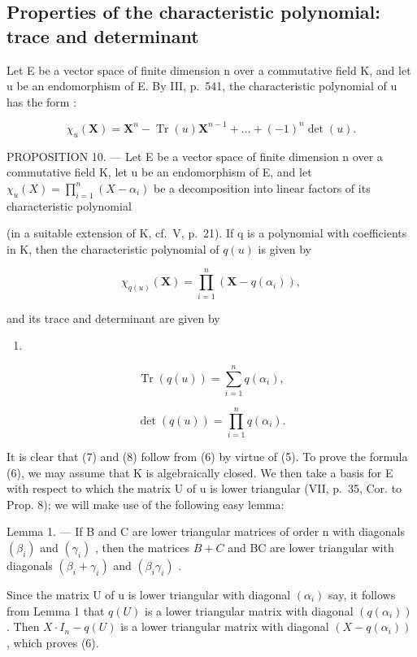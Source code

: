 \subsection{Properties of the characteristic polynomial: trace and determinant}

Let E be a vector space of finite dimension n over a commutative field K, and let u be an endomorphism of E. By III, p.~541, the characteristic polynomial of u has the form :

\[
\chi_ {u} (\mathbf {X}) = \mathbf {X} ^ {n} - \operatorname{Tr} (u) \mathbf {X} ^ {n - 1} + \dots + (- 1) ^ {n} \det (u).\tag{5}
\]

PROPOSITION 10. --- Let E be a vector space of finite dimension n over a commutative field K, let u be an endomorphism of E, and let \(\chi_u(X) = \prod_{i=1}^{n}(X - \alpha_i)\) be a decomposition into linear factors of its characteristic polynomial

(in a suitable extension of K, cf.~V, p.~21). If q is a polynomial with coefficients in K, then the characteristic polynomial of \(q(u)\) is given by

\[
\chi_ {q (u)} (\mathbf {X}) = \prod_ {i = 1} ^ {n} \left(\mathbf {X} - q \left(\alpha_ {i}\right)\right),\tag{6}
\]

and its trace and determinant are given by

\begin{enumerate}
\def\labelenumi{(\arabic{enumi})}
\setcounter{enumi}{6}
\tightlist
\item
\end{enumerate}

\[
\operatorname{Tr} (q (u)) = \sum_ {i = 1} ^ {n} q (\alpha_ {i}),\tag{8}
\]

\[
\det (q (u)) = \prod_ {i = 1} ^ {n} q (\alpha_ {i}).
\]

It is clear that (7) and (8) follow from (6) by virtue of (5). To prove the formula (6), we may assume that K is algebraically closed. We then take a basis for E with respect to which the matrix U of u is lower triangular (VII, p.~35, Cor. to Prop. 8); we will make use of the following easy lemma:

Lemma 1. --- If B and C are lower triangular matrices of order n with diagonals \((\beta_{i})\) and \((\gamma_{i})\) , then the matrices \(B + C\) and BC are lower triangular with diagonals \((\beta_{i} + \gamma_{i})\) and \((\beta_{i}\gamma_{i})\) .

Since the matrix U of u is lower triangular with diagonal \((\alpha_{i})\) say, it follows from Lemma 1 that \(q(U)\) is a lower triangular matrix with diagonal \((q(\alpha_{i}))\) . Then \(X \cdot I_{n} - q(U)\) is a lower triangular matrix with diagonal \((X - q(\alpha_{i}))\) , which proves (6).

